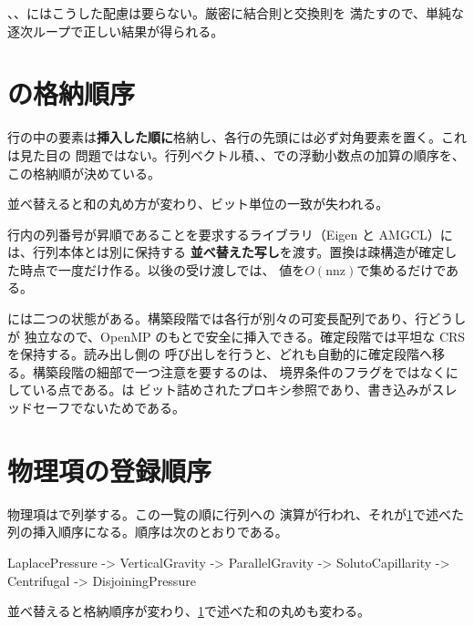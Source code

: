 、、にはこうした配慮は要らない。厳密に結合則と交換則を
満たすので、単純な逐次ループで正しい結果が得られる。

\section{の格納順序}
\label{sec:repro:crs}

行の中の要素は\textbf{挿入した順に}格納し、各行の先頭には必ず対角要素を置く。これは見た目の
問題ではない。行列ベクトル積、、での浮動小数点の加算の順序を、
この格納順が決めている。

\begin{warn}[行の要素を列番号の昇順に並べ替えてはならない]
  並べ替えると和の丸め方が変わり、ビット単位の一致が失われる。
\end{warn}

行内の列番号が昇順であることを要求するライブラリ（Eigen と AMGCL）には、行列本体とは別に保持する
\textbf{並べ替えた写し}を渡す。置換は疎構造が確定した時点で一度だけ作る。以後の受け渡しでは、
値を$O(\mathrm{nnz})$で集めるだけである。

には二つの状態がある。構築段階では各行が別々の可変長配列であり、行どうしが
独立なので、OpenMP のもとで安全に挿入できる。確定段階では平坦な CRS を保持する。読み出し側の
呼び出しを行うと、どれも自動的に確定段階へ移る。構築段階の細部で一つ注意を要するのは、
境界条件のフラグをではなくにしている点である。は
ビット詰めされたプロキシ参照であり、書き込みがスレッドセーフでないためである。

\section{物理項の登録順序}
\label{sec:repro:order}

物理項はで列挙する。この一覧の順に行列への
\code{+=}演算が行われ、それが\cref{sec:repro:crs}で述べた列の挿入順序になる。順序は次のとおりである。

\begin{plain}
LaplacePressure -> VerticalGravity -> ParallelGravity
                -> SolutoCapillarity -> Centrifugal -> DisjoiningPressure
\end{plain}

\begin{warn}
  並べ替えると格納順序が変わり、\cref{sec:repro:crs}で述べた和の丸めも変わる。
\end{warn}

